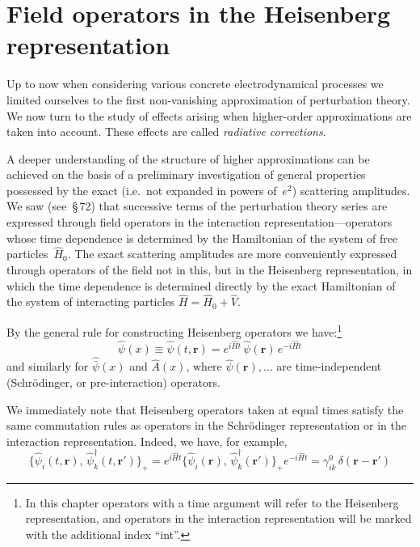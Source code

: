
\section{Field operators in the Heisenberg representation}


Up to now when considering various concrete electrodynamical processes we limited ourselves to the first non-vanishing approximation of perturbation theory. We now turn to the study of effects arising when higher-order approximations are taken into account. These effects are called \emph{radiative corrections}.

A deeper understanding of the structure of higher approximations can be achieved on the basis of a preliminary investigation of general properties possessed by the exact (i.e.\ not expanded in powers of~$e^2$) scattering amplitudes. We saw (see~\S\,72) that successive terms of the perturbation theory series are expressed through field operators in the interaction representation---operators whose time dependence is determined by the Hamiltonian of the system of free particles~$\hat{H}_0$. The exact scattering amplitudes are more conveniently expressed through operators of the field not in this, but in the Heisenberg representation, in which the time dependence is determined directly by the exact Hamiltonian of the system of interacting particles $\hat{H} = \hat{H}_0 + \hat{V}$.

By the general rule for constructing Heisenberg operators we have:\footnote{In this chapter operators with a time argument will refer to the Heisenberg representation, and operators in the interaction representation will be marked with the additional index ``int''.}
\begin{equation}
\hat{\psi}(x) \equiv \hat{\psi}(t, \mathbf{r}) = e^{i\hat{H}t}\,\hat{\psi}(\mathbf{r})\,e^{-i\hat{H}t}
\label{eq:102.1}
\end{equation}
and similarly for $\hat{\bar{\psi}}(x)$ and $\hat{A}(x)$, where $\hat{\psi}(\mathbf{r}), \ldots$ are time-independent (Schr\"odinger, or pre-interaction) operators.

We immediately note that Heisenberg operators taken at equal times satisfy the same commutation rules as operators in the Schr\"odinger representation or in the interaction representation. Indeed, we have, for example,
\begin{equation}
\bigl\{\hat{\psi}_i(t, \mathbf{r}),\, \hat{\psi}_k^\dagger(t, \mathbf{r}')\bigr\}_+ = e^{i\hat{H}t}\bigl\{\hat{\psi}_i(\mathbf{r}),\, \hat{\psi}_k^\dagger(\mathbf{r}')\bigr\}_+ e^{-i\hat{H}t} = \gamma^0_{ik}\,\delta(\mathbf{r} - \mathbf{r}')
\label{eq:102.2}
\end{equation}


